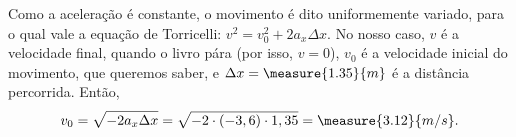 \begin{question}
\begin{solution}
		Como a aceleração é constante, o movimento é dito uniformemente variado, para o qual vale a equação de Torricelli: $v^2 = v_0^2 + 2 a_x \Delta x$.
		No nosso caso, $v$ é a velocidade final, quando o livro pára (por isso, $v = 0$), $v_0$ é a velocidade inicial do movimento, que queremos saber, e $\Delta x = \measure{1.35}{m}$ é a distância percorrida.
		Então,
		\begin{equation*}
		v_0 = \sqrt{-2a_x\Delta x} = \sqrt{-2 \cdot (-3,6) \cdot 1,35} = \measure{3.12}{m/s}.
		\end{equation*}
	\end{solution}
\end{question}